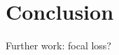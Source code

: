 \documentclass[class=article, crop=false]{standalone}
\begin{document}
\section{Conclusion}
\label{sec:conclusion}

Further work: focal loss?





\end{document}
